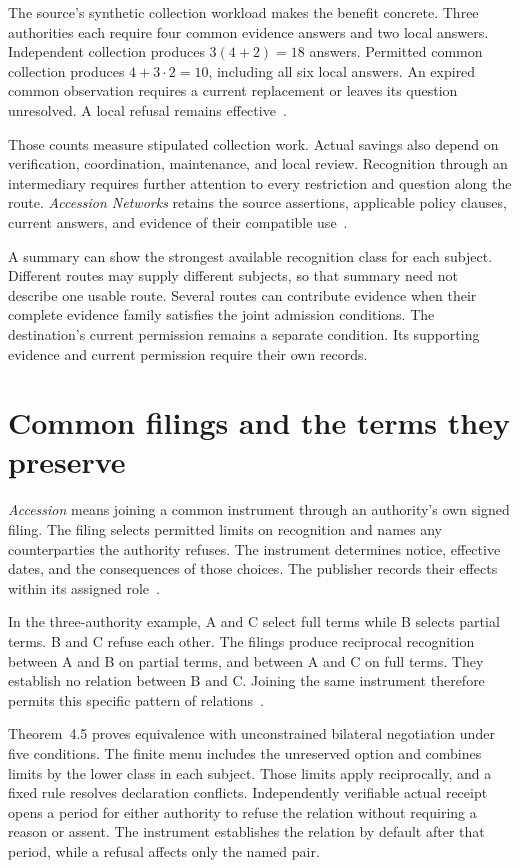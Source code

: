 \documentclass{momentum}
\begin{document}
The source's synthetic collection workload makes the benefit concrete.
Three authorities each require four common evidence answers and two local answers.
Independent collection produces \(3(4+2)=18\) answers.
Permitted common collection produces \(4+3\cdot2=10\), including all six local answers.
An expired common observation requires a current replacement or leaves its question unresolved.
A local refusal remains effective~\cite[Section~10]{entity}.

Those counts measure stipulated collection work.
Actual savings also depend on verification, coordination, maintenance, and local review.
Recognition through an intermediary requires further attention to every restriction and question along the route.
\emph{Accession Networks} retains the source assertions, applicable policy clauses, current answers, and evidence of their compatible use~\cite[Sections~5.2 and 6.3]{accession}.

A summary can show the strongest available recognition class for each subject.
Different routes may supply different subjects, so that summary need not describe one usable route.
Several routes can contribute evidence when their complete evidence family satisfies the joint admission conditions.
The destination's current permission remains a separate condition.
Its supporting evidence and current permission require their own records.

\section{Common filings and the terms they preserve}
\label{sec:accession}

\emph{Accession} means joining a common instrument through an authority's own signed filing.
The filing selects permitted limits on recognition and names any counterparties the authority refuses.
The instrument determines notice, effective dates, and the consequences of those choices.
The publisher records their effects within its assigned role~\cite[Sections~2.2 and 6]{accession}.

In the three-authority example, A and C select full terms while B selects partial terms.
B and C refuse each other.
The filings produce reciprocal recognition between A and B on partial terms, and between A and C on full terms.
They establish no relation between B and C.
Joining the same instrument therefore permits this specific pattern of relations~\cite[Section~2.2]{accession}.

Theorem~4.5 proves equivalence with unconstrained bilateral negotiation under five conditions.
The finite menu includes the unreserved option and combines limits by the lower class in each subject.
Those limits apply reciprocally, and a fixed rule resolves declaration conflicts.
Independently verifiable actual receipt opens a period for either authority to refuse the relation without requiring a reason or assent.
The instrument establishes the relation by default after that period, while a refusal affects only the named pair.
\end{document}

